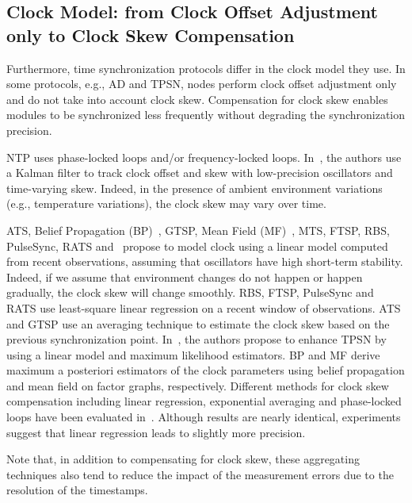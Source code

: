 \subsection{Clock Model: from Clock Offset Adjustment only to Clock Skew Compensation}


Furthermore, time synchronization protocols differ in the clock model they use. In some protocols, e.g., AD and TPSN, nodes perform clock offset adjustment only and do not take into account clock skew. Compensation for clock skew enables modules to be synchronized less frequently without degrading the synchronization precision. 

NTP uses phase-locked loops and/or frequency-locked loops. In~\cite{kim2012tracking}, the authors use a Kalman filter to track clock offset and skew with low-precision oscillators and time-varying skew. Indeed, in the presence of ambient environment variations (e.g., temperature variations), the clock skew may vary over time. 

ATS, Belief Propagation (BP)~\cite{etzlinger2014cooperative}, GTSP, Mean Field (MF)~\cite{etzlinger2014cooperative}, MTS, FTSP, RBS, PulseSync, RATS and~\cite{noh2007novel,leng2010clock} propose to model clock using a linear model computed from recent observations, assuming that oscillators have high short-term stability. Indeed, if we assume that environment changes do not happen or happen gradually, the clock skew will change smoothly. RBS, FTSP, PulseSync and RATS use least-square linear regression on a recent window of observations. ATS and GTSP use an averaging technique to estimate the clock skew based on the previous synchronization point. In~\cite{noh2007novel,leng2010clock}, the authors propose to enhance TPSN by using a linear model and maximum likelihood estimators. BP and MF derive maximum a posteriori estimators of the clock parameters using belief propagation and mean field on factor graphs, respectively. Different methods for clock skew compensation including linear regression, exponential averaging and phase-locked loops have been evaluated in~\cite{amundson2008time}. Although results are nearly identical, experiments suggest that linear regression leads to slightly more precision.

Note that, in addition to compensating for clock skew, these aggregating techniques also tend to reduce the impact of the measurement errors due to the resolution of the timestamps.

